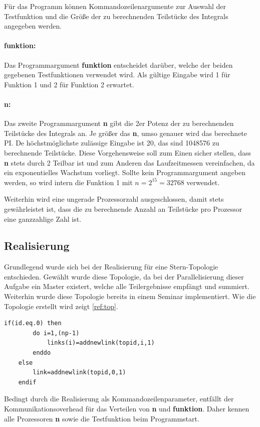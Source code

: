 Für das Programm können Kommandozeilenargumente zur Auswahl der Testfunktion und die Größe der zu berechnenden Teilstücke des Integrals angegeben werden.
\paragraph{funktion:}
Das Programmargument \textbf{funktion} entscheidet darüber, welche der beiden gegebenen Testfunktionen verwendet wird.
Als gültige Eingabe wird 1 für Funktion 1 und 2 für Funktion 2 erwartet.
\paragraph{n:}
Das zweite Programmargument \textbf{n} gibt die 2er Potenz der zu berechnenden Teilstücke des Integrals an.
Je größer das \textbf{n}, umso genauer wird das berechnete PI.
De höchstmöglichste zulässige Eingabe ist 20, das sind 1048576 zu berechnende Teilstücke.
Diese Vorgehensweise soll zum Einen sicher stellen, dass \textbf{n} stets durch 2 Teilbar ist und zum Anderen das Laufzeitmessen vereinfachen, da ein exponentielles Wachstum vorliegt.
Sollte kein Programmargument angeben werden, so wird intern die Funktion 1 mit $n = 2^{15} = 32768$ verwendet.

Weiterhin wird eine ungerade Prozessorzahl ausgeschlossen, damit stets gewährleistet ist, dass die zu berechnende Anzahl an Teilstücke pro Prozessor eine ganzzahlige Zahl ist.

\subsection{Realisierung}
\label{ref:realisierung}
Grundlegend wurde sich bei der Realisierung für eine Stern-Topologie entschieden.
Gewählt wurde diese Topologie, da bei der Parallelisierung dieser Aufgabe ein Master existert, welche alle Teilergebnisse empfängt und summiert.
Weiterhin wurde diese Topologie bereits in einem Seminar implementiert.
Wie die Topologie erstellt wird zeigt \autoref{ref:top}.

\begin{lstlisting}[caption=Erzeugen der Stern-Topologie\label{ref:top}]
	if(id.eq.0) then
		do i=1,(np-1)
			links(i)=addnewlink(topid,i,1)
		enddo
	else
		link=addnewlink(topid,0,1)
	endif
\end{lstlisting}

Bedingt durch die Realisierung als Kommandozeilenparameter, entfällt der Kommunikationsoverhead für das Verteilen von \textbf{n} und \textbf{funktion}.
Daher kennen alle Prozessoren \textbf{n} sowie die Testfunktion beim Programmstart.


